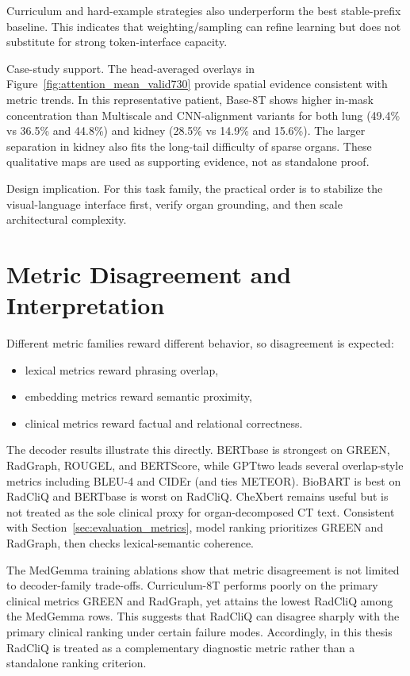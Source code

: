 Curriculum and hard-example strategies also underperform the best stable-prefix baseline. This indicates that weighting/sampling can refine learning but does not substitute for strong token-interface capacity.

Case-study support. The head-averaged overlays in Figure~\ref{fig:attention_mean_valid730} provide spatial evidence consistent with metric trends. In this representative patient, Base-8T shows higher in-mask concentration than Multiscale and CNN-alignment variants for both lung (49.4\% vs 36.5\% and 44.8\%) and kidney (28.5\% vs 14.9\% and 15.6\%). The larger separation in kidney also fits the long-tail difficulty of sparse organs. These qualitative maps are used as supporting evidence, not as standalone proof.

Design implication. For this task family, the practical order is to stabilize the visual-language interface first, verify organ grounding, and then scale architectural complexity.

\section{Metric Disagreement and Interpretation}
Different metric families reward different behavior, so disagreement is expected:
\begin{itemize}
    \item lexical metrics reward phrasing overlap,
    \item embedding metrics reward semantic proximity,
    \item clinical metrics reward factual and relational correctness.
\end{itemize}

The decoder results illustrate this directly. \ac{BERTbase} is strongest on \ac{GREEN}, \ac{RadGraph}, \ac{ROUGEL}, and \ac{BERTScore}, while \ac{GPTtwo} leads several overlap-style metrics including BLEU-4 and \ac{CIDEr} (and ties METEOR). BioBART is best on \ac{RadCliQ} and \ac{BERTbase} is worst on \ac{RadCliQ}. \ac{CheXbert} remains useful but is not treated as the sole clinical proxy for organ-decomposed CT text. Consistent with Section~\ref{sec:evaluation_metrics}, model ranking prioritizes \ac{GREEN} and \ac{RadGraph}, then checks lexical-semantic coherence.

The MedGemma training ablations show that metric disagreement is not limited to decoder-family trade-offs. Curriculum-8T performs poorly on the primary clinical metrics \ac{GREEN} and \ac{RadGraph}, yet attains the lowest \ac{RadCliQ} among the MedGemma rows. This suggests that \ac{RadCliQ} can disagree sharply with the primary clinical ranking under certain failure modes. Accordingly, in this thesis \ac{RadCliQ} is treated as a complementary diagnostic metric rather than a standalone ranking criterion.


